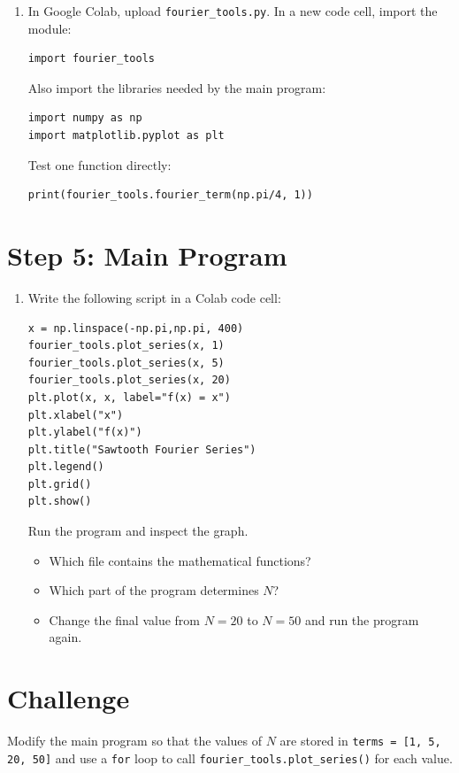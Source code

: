 \documentclass{article}
\begin{document}
\begin{enumerate}

\item In Google Colab, upload \verb+fourier_tools.py+. In a new code cell, import the module:

\begin{verbatim}
import fourier_tools
\end{verbatim}

Also import the libraries needed by the main program:

\begin{verbatim}
import numpy as np
import matplotlib.pyplot as plt
\end{verbatim}

Test one function directly:

\begin{verbatim}
print(fourier_tools.fourier_term(np.pi/4, 1))
\end{verbatim}

\end{enumerate}


\section{Step 5: Main Program}

\begin{enumerate}

\item Write the following script in a Colab code cell:

\begin{verbatim}
x = np.linspace(-np.pi,np.pi, 400)
fourier_tools.plot_series(x, 1)
fourier_tools.plot_series(x, 5)
fourier_tools.plot_series(x, 20)
plt.plot(x, x, label="f(x) = x")
plt.xlabel("x")
plt.ylabel("f(x)")
plt.title("Sawtooth Fourier Series")
plt.legend()
plt.grid()
plt.show()
\end{verbatim}

Run the program and inspect the graph.

\begin{itemize}

\item Which file contains the mathematical functions?

\item Which part of the program determines $N$?

\item Change the final value from $N=20$ to $N=50$ and run the program again.

\end{itemize}

\end{enumerate}


\section{Challenge}

Modify the main program so that the values of $N$ are stored in \verb+terms = [1, 5, 20, 50]+ and use a \texttt{for}  loop to call \texttt{fourier\_tools.plot\_series()} for each value.
\end{document}

